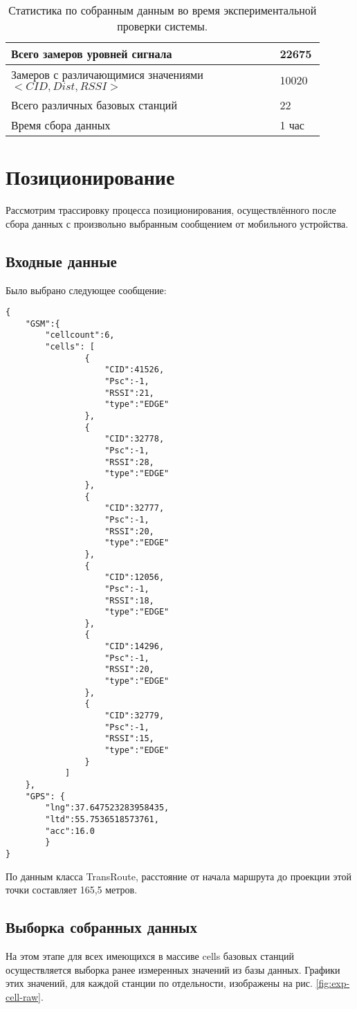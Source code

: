 \begin{table}
	\caption{\label{tab:exp-collect-data}Статистика по собранным данным во время экспериментальной проверки системы.}
	\begin{center}
		\begin{tabular}{|p{0.8\linewidth}|p{0.1\linewidth}|}
			\hline
			Всего замеров уровней сигнала & 22675 \\
			\hline
			Замеров с различающимися значениями $<CID, Dist, RSSI>$ & 10020 \\
			\hline
			Всего различных базовых станций & 22 \\
			\hline
			Время сбора данных & 1 час \\
			\hline
		\end{tabular}
	\end{center}
\end{table}




\section{Позиционирование}
Рассмотрим трассировку процесса позиционирования, осуществлённого после сбора данных с произвольно выбранным сообщением от мобильного устройства.

\subsection{Входные данные}
Было выбрано следующее сообщение:

\lstset{language=Python}
\begin{lstlisting}
{
	"GSM":{
		"cellcount":6,
		"cells": [
				{
					"CID":41526,
					"Psc":-1,
					"RSSI":21,
					"type":"EDGE"
				},
				{
					"CID":32778,
					"Psc":-1,
					"RSSI":28,
					"type":"EDGE"
				}, 
				{
					"CID":32777,
					"Psc":-1,
					"RSSI":20,
					"type":"EDGE"
				}, 
				{
					"CID":12056,
					"Psc":-1,
					"RSSI":18,
					"type":"EDGE"
				},
				{
					"CID":14296,
					"Psc":-1,
					"RSSI":20,
					"type":"EDGE"
				},
				{
					"CID":32779,
					"Psc":-1,
					"RSSI":15,
					"type":"EDGE"
				}
			]
	}, 
	"GPS": {
		"lng":37.647523283958435,
		"ltd":55.7536518573761,
		"acc":16.0
		}
}
\end{lstlisting}

По данным класса TransRoute, расстояние от начала маршрута до проекции этой точки составляет 165,5 метров.

\subsection{Выборка собранных данных}
На этом этапе для всех имеющихся в массиве cells базовых станций осуществляется выборка ранее измеренных значений из базы данных. Графики этих значений, для каждой станции по отдельности, изображены на рис. \ref{fig:exp-cell-raw}.

